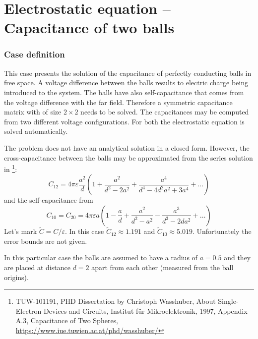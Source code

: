 \chapter{Electrostatic equation -- Capacitance of two balls}




\subsection*{Case definition}

This case presents the solution of the capacitance of perfectly conducting balls in free space. 
A voltage difference between the balls results to electric charge being introduced to the system. The balls have 
also self-capacitance that comes from the voltage difference with the far field. Therefore a symmetric capacitance matrix
with of size $2\times2$ needs to be solved.
The capacitances may be computed from two different voltage configurations.
For both the electrostatic equation is solved automatically. 

The problem does not have an analytical solution in a closed form. 
However, the cross-capacitance between the balls may be approximated from the series solution in \footnote{TUW-101191, PHD Dissertation by Christoph Wasshuber, About Single-Electron Devices and Circuits, {I}nstitut f{\"u}r {M}ikroelektronik, 1997, Appendix A.3, Capacitance of Two Spheres, \url{https://www.iue.tuwien.ac.at/phd/wasshuber/} }:
\begin{equation}
C_{12} = 4 \pi \varepsilon \frac{a^2}{d}\left ( 1 + \frac{a^2}{d^2-2a^2} + \frac{a^4}{d^4-4d^2a^2 + 3a^4}+ \ldots \right )
\end{equation}
and the self-capacitance from 
\begin{equation}
C_{10} = C_{20} = 4 \pi \varepsilon a \left ( 1 - \frac{a}{d} + \frac{a^2}{d^2-a^2} - \frac{a^3}{d^3-2da^2}+ \ldots \right )
\end{equation}
Let's mark $\tilde{C} = C / \varepsilon$. In this case $\tilde{C}_{12} \approx 1.191$ and $\tilde{C}_{10} \approx 5.019$.
Unfortunately the error bounds are not given.

In this particular case 
the balls are assumed to have a radius of $a=0.5$ and they are placed at distance $d=2$ apart from 
each other (measured from the ball origins). 


